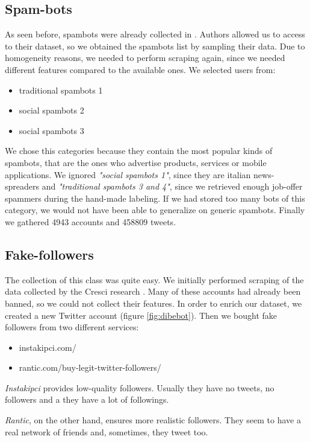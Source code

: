 \subsection{Spam-bots}
As seen before, spambots were already collected in \cite{Cresci}. Authors allowed us to access to their dataset, so we obtained the spambots list by sampling their data. Due to homogeneity reasons, we needed to perform scraping again, since we needed different features compared to the available ones.
We selected users from:
\begin{itemize}
	\item[\PencilRight]traditional spambots 1
	\item[\PencilRight]social spambots 2
	\item[\PencilRight]social spambots 3
\end{itemize}

We chose this categories because they contain the most popular kinds of spambots, that are the ones who advertise products, services or mobile applications. We ignored \emph{"social spambots 1"}, since they are italian news-spreaders and \emph{"traditional spambots 3 and 4"}, since we retrieved enough job-offer spammers during the hand-made labeling. If we had stored too many bots of this category, we would not have been able to generalize on generic spambots. Finally we gathered 4943 accounts and 458809 tweets.

\subsection{Fake-followers}
The collection of this class was quite easy. We initially performed scraping of the data collected by the Cresci research \cite{Cresci}. Many of these accounts had already been banned, so we could not collect their features. In order to enrich our dataset, we created a new Twitter account (figure \ref{fig:dibebot}). Then we bought fake followers from two different services:
\begin{itemize}
	\item[\PencilRight] instakipci.com/
	\item[\PencilRight] rantic.com/buy-legit-twitter-followers/
\end{itemize}

\emph{Instakipci} provides low-quality followers. Usually they have no tweets, no followers and a they have a lot of followings.

\emph{Rantic}, on the other hand, ensures more realistic followers. They seem to have a real network of friends and, sometimes, they tweet too.

